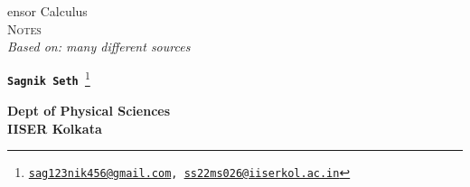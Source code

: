 \documentclass[usenames, svgnames, dvipsnames]{scrartcl}
\begin{document}
\makeatletter
\begin{titlepage}
    \vspace*{2cm}
    
        \begin{center}
            {\rmfamily
                \Huge{\textcolor{blue!30!black}{%
                    \textmd{{}}ensor {\HUGE C}alculus
                }}\\[0.7cm]
               
                
                \Large \textsc{Notes} \\[0.3cm]
               \Large \textit{Based on: many different sources}\\[0.5cm]

            }
            \end{center}
      \begin{figure}[H]
        \centering 
         
      \end{figure}
       
        \vspace{1cm}
        \begin{center}
           \Large \texttt{\textbf{{\LARGE  S}agnik {\LARGE S}eth }\footnote{\href{mailto: sag123nik456@gmail.com}{sag123nik456@gmail.com}, \href{mailto:ss22ms026@iiserkol.ac.in}{ss22ms026@iiserkol.ac.in}}}
        \end{center}
        \vspace{0.5cm}
      \begin{center}
    \textbf{ Dept of Physical Sciences} \\
    \textbf{IISER Kolkata}
    \vspace{0.5cm}

   
\end{center}

\end{titlepage}

  
       
\tableofcontents
\newpage









\end{document}

